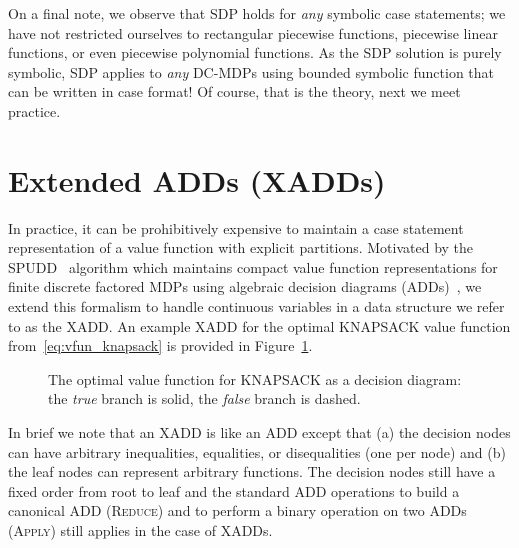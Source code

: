 \documentclass[letterpaper]{article}
\begin{document}

On a final note, we observe that SDP holds for \emph{any} symbolic
case statements; we have not restricted ourselves to rectangular
piecewise functions, piecewise linear functions, or even piecewise
polynomial functions.  As the SDP solution is purely symbolic,
SDP applies to \emph{any} DC-MDPs using bounded symbolic function 
that can be written in case format!  Of course, that is the theory,
next we meet practice.

\section{Extended ADDs (XADDs)}

In practice, it can be prohibitively expensive to maintain
a case statement representation of a value function with explicit
partitions.  Motivated by the SPUDD~\cite{spudd} algorithm which
maintains compact value function representations for finite discrete
factored MDPs using algebraic decision diagrams (ADDs)~\cite{bahar93add},
we extend this formalism to handle continuous variables in a data
structure we refer to as the XADD.  An example XADD for the optimal
KNAPSACK value function from~\eqref{eq:vfun_knapsack} is provided
in Figure~\ref{fig:knapsack_vfun}.

\begin{figure}[t]
\begin{center}
\fbox{$\qquad$}
\end{center}
\vspace{-3mm}
\caption{%
The optimal value function for KNAPSACK
as a decision diagram: 
the \emph{true} branch is solid, the \emph{false}
branch is dashed.} \label{fig:knapsack_vfun}
\vspace{-3mm}
\end{figure}

In brief we note that an XADD is like an ADD except that (a) the decision
nodes can have arbitrary inequalities, equalities, or disequalities (one
per node) and (b) the leaf nodes can represent arbitrary functions.
The decision nodes still have a fixed order from root to leaf
and the standard ADD
operations to build a canonical ADD (\textsc{Reduce}) and 
to perform a binary operation on two ADDs (\textsc{Apply}) 
still applies in the case of XADDs.
\end{document}
